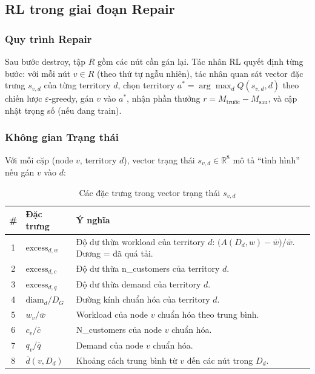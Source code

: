 \documentclass[12pt, a4paper]{article}
\begin{document}
\subsection{RL trong giai đoạn Repair}
\label{subsec:rl}

\subsubsection{Quy trình Repair}

Sau bước destroy, tập $R$ gồm các nút cần gán lại. Tác nhân RL quyết định từng bước:
với mỗi nút $v \in R$ (theo thứ tự ngẫu nhiên), tác nhân quan sát vector đặc
trưng $s_{v,d}$ của từng territory $d$, chọn territory $a^* = \arg\max_d Q(s_{v,d}, d)$
theo chiến lược $\varepsilon$-greedy, gán $v$ vào $a^*$, nhận phần thưởng
$r = M_{\text{trước}} - M_{\text{sau}}$, và cập nhật trọng số (nếu đang train).

\subsubsection{Không gian Trạng thái}

Với mỗi cặp (node $v$, territory $d$), vector trạng thái $s_{v,d} \in \mathbb{R}^8$
mô tả ``tình hình'' nếu gán $v$ vào $d$:

\begin{table}[H]
  \centering
  \caption{Các đặc trưng trong vector trạng thái $s_{v,d}$}
  \begin{tabular}{clp{8cm}}
    \toprule
    \# & Đặc trưng & Ý nghĩa \\
    \midrule
    1 & $\text{excess}_{d,w}$ & Độ dư thừa workload của territory $d$:
        $\bigl(A(D_d,w)-\bar{w}\bigr)/\bar{w}$. Dương = đã quá tải. \\
    2 & $\text{excess}_{d,c}$ & Độ dư thừa n\_customers của territory $d$. \\
    3 & $\text{excess}_{d,q}$ & Độ dư thừa demand của territory $d$. \\
    4 & $\text{diam}_d / D_G$ & Đường kính chuẩn hóa của territory $d$. \\
    5 & $w_v / \bar{w}$ & Workload của node $v$ chuẩn hóa theo trung bình. \\
    6 & $c_v / \bar{c}$ & N\_customers của node $v$ chuẩn hóa. \\
    7 & $q_v / \bar{q}$ & Demand của node $v$ chuẩn hóa. \\
    8 & $\bar{d}(v, D_d)$ & Khoảng cách trung bình từ $v$ đến các nút trong $D_d$. \\
    \bottomrule
  \end{tabular}
\end{table}
\end{document}
